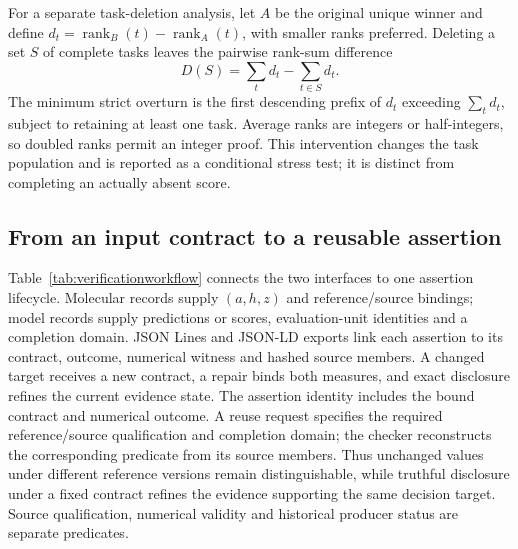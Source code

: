 For a separate task-deletion analysis, let $A$ be the original unique winner and define $d_t=\operatorname{rank}_B(t)-\operatorname{rank}_A(t)$, with smaller ranks preferred. Deleting a set $S$ of complete tasks leaves the pairwise rank-sum difference
\begin{equation}\label{eq:taskdeletion}
D(S)=\sum_td_t-\sum_{t\in S}d_t.
\end{equation}
The minimum strict overturn is the first descending prefix of $d_t$ exceeding $\sum_td_t$, subject to retaining at least one task. Average ranks are integers or half-integers, so doubled ranks permit an integer proof. This intervention changes the task population and is reported as a conditional stress test; it is distinct from completing an actually absent score.



\subsection{From an input contract to a reusable assertion}\label{subsec:workflow}
Table~\ref{tab:verificationworkflow} connects the two interfaces to one assertion lifecycle. Molecular records supply $(a,h,z)$ and reference/source bindings; model records supply predictions or scores, evaluation-unit identities and a completion domain. JSON Lines and JSON-LD exports link each assertion to its contract, outcome, numerical witness and hashed source members. A changed target receives a new contract, a repair binds both measures, and exact disclosure refines the current evidence state. The assertion identity includes the bound contract and numerical outcome. A reuse request specifies the required reference/source qualification and completion domain; the checker reconstructs the corresponding predicate from its source members. Thus unchanged values under different reference versions remain distinguishable, while truthful disclosure under a fixed contract refines the evidence supporting the same decision target. Source qualification, numerical validity and historical producer status are separate predicates.

